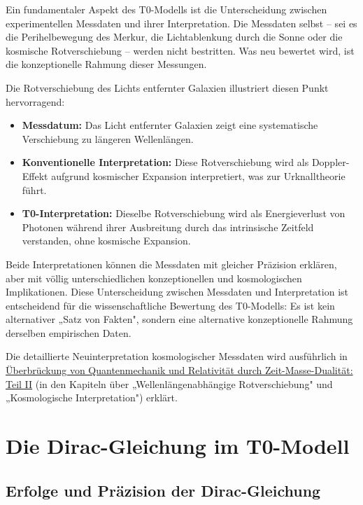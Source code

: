 \documentclass[12pt,a4paper]{article}
\begin{document}
	Ein fundamentaler Aspekt des T0-Modells ist die Unterscheidung zwischen experimentellen Messdaten und ihrer Interpretation. Die Messdaten selbst – sei es die Perihelbewegung des Merkur, die Lichtablenkung durch die Sonne oder die kosmische Rotverschiebung – werden nicht bestritten. Was neu bewertet wird, ist die konzeptionelle Rahmung dieser Messungen.
	
	Die Rotverschiebung des Lichts entfernter Galaxien illustriert diesen Punkt hervorragend:
	
	\begin{itemize}
		\item \textbf{Messdatum:} Das Licht entfernter Galaxien zeigt eine systematische Verschiebung zu längeren Wellenlängen.
		
		\item \textbf{Konventionelle Interpretation:} Diese Rotverschiebung wird als Doppler-Effekt aufgrund kosmischer Expansion interpretiert, was zur Urknalltheorie führt.
		
		\item \textbf{T0-Interpretation:} Dieselbe Rotverschiebung wird als Energieverlust von Photonen während ihrer Ausbreitung durch das intrinsische Zeitfeld verstanden, ohne kosmische Expansion.
	\end{itemize}
	
	Beide Interpretationen können die Messdaten mit gleicher Präzision erklären, aber mit völlig unterschiedlichen konzeptionellen und kosmologischen Implikationen. Diese Unterscheidung zwischen Messdaten und Interpretation ist entscheidend für die wissenschaftliche Bewertung des T0-Modells: Es ist kein alternativer „Satz von Fakten", sondern eine alternative konzeptionelle Rahmung derselben empirischen Daten.
	
	Die detaillierte Neuinterpretation kosmologischer Messdaten wird ausführlich in \href{https://github.com/jpascher/T0-Time-Mass-Duality/tree/main/2/pdf/English/QMRelTimeMassPart2En.pdf}{Überbrückung von Quantenmechanik und Relativität durch Zeit-Masse-Dualität: Teil II} (in den Kapiteln über „Wellenlängenabhängige Rotverschiebung" und „Kosmologische Interpretation") erklärt.
	
	\section{Die Dirac-Gleichung im T0-Modell}
	\label{sec:dirac_equation}
	
	\subsection{Erfolge und Präzision der Dirac-Gleichung}
	\label{subsec:dirac_success}
	
\end{document}

